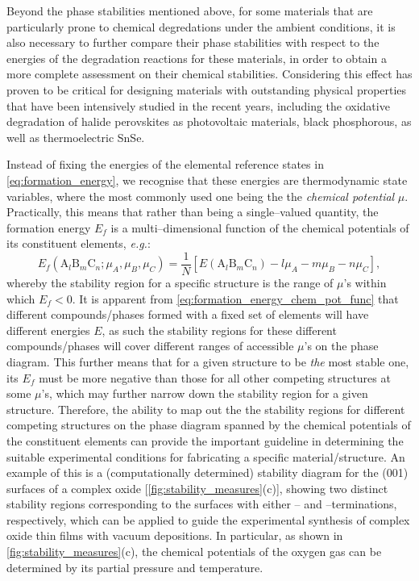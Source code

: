 Beyond the phase stabilities mentioned above, for some materials that are particularly prone to chemical degredations under the ambient conditions, it is also necessary to further compare their phase stabilities with respect to the energies of the degradation reactions for these materials, in order to obtain a more complete assessment on their chemical stabilities. Considering this effect has proven to be critical for designing materials with outstanding physical properties that have been intensively studied in the recent years, including the oxidative degradation of halide perovskites as photovoltaic materials,\cite{senocrate2019thermochemical,senocrate2018interaction} black phosphorous,\cite{zhou2016light,zhang2018degradation} as well as thermoelectric SnSe.\cite{li2016high} 

Instead of fixing the energies of the  elemental reference states in \cref{eq:formation_energy}, we recognise that these energies are thermodynamic state variables, where the most commonly used one being the the \emph{chemical potential} $\mu$. Practically, this means that rather than being a single--valued quantity, the formation energy $E_f$ is a multi--dimensional function of the chemical potentials of its constituent elements, \emph{e.g.}:
\begin{equation}\label{eq:formation_energy_chem_pot_func}
E_f(\mbox{A}_l\mbox{B}_m\mbox{C}_n; \mu_A,\mu_B,\mu_C) =\frac{1}{N}\left[ E\left(\mbox{A}_l\mbox{B}_m\mbox{C}_n\right)  -l\mu_{A}-m\mu_B-n\mu_C\right],
\end{equation}
whereby the stability region for a specific structure is the range of $\mu$'s within which $E_f<0$. It is apparent from \cref{eq:formation_energy_chem_pot_func} that  different compounds/phases formed with a fixed set of elements  will have different energies $E$, as such the stability regions for these different compounds/phases will cover different ranges of accessible $\mu$'s on the phase diagram.  This further means that for a given structure to be \emph{the} most stable one, its $E_f$ must be more negative than those for all other competing structures at some $\mu$'s, which may further narrow down the stability region for a given structure. Therefore, the ability to map out the the stability regions for different competing structures on the phase diagram  spanned by the chemical potentials of the constituent elements can provide the important guideline in determining the suitable experimental conditions  for fabricating a specific material/structure. An example of this is a (computationally determined) stability diagram for the (001) surfaces of a complex oxide  [\cref{fig:stability_measures}(c)],\cite{piskunov2008electronic} showing two distinct stability regions corresponding to the  surfaces with either -- and --terminations, respectively, which can be applied to guide the experimental synthesis of complex oxide thin films with vacuum depositions. In particular, as shown in \cref{fig:stability_measures}(c), the chemical potentials of the oxygen gas can be determined by its partial pressure and temperature. 

